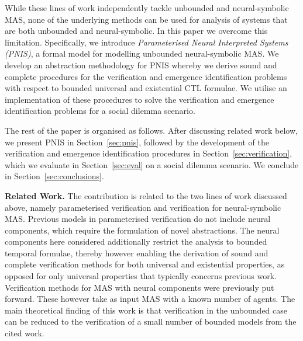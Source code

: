 While these lines of work independently tackle unbounded and neural-symbolic
MAS, none of the underlying methods can be used for analysis of systems that are
both unbounded and neural-symbolic.  In this paper we overcome this limitation.
Specifically, we introduce \emph{Parameterised Neural Interpreted Systems (PNIS)}, a
formal model
for modelling unbounded neural-symbolic MAS.  We develop an abstraction
methodology for PNIS whereby we derive sound and complete procedures for the
verification and emergence identification problems with respect to bounded
universal and existential CTL formulae.  We utilise an implementation of these
procedures to solve the verification and emergence identification problems for a
social dilemma scenario.




The rest of the paper is organised as follows. After discussing related work
below, we present PNIS in Section~\ref{sec:pnis}, followed by the development of
the verification and emergence identification procedures in
Section~\ref{sec:verification}, which we evaluate in Section~\ref{sec:eval}  on
a social dilemma scenario. We conclude in Section~\ref{sec:conclusions}.


{\bf Related Work.}  The contribution is related to the two lines of work
discussed above, namely parameterised verification and verification for
neural-symbolic MAS. Previous models in parameterised verification do not
include neural components, which require the formulation of novel abstractions.
The neural components here considered additionally restrict the analysis to
bounded temporal formulae, thereby however enabling the derivation of sound and
complete verification methods for both universal and existential properties, as
opposed for only universal properties that typically concerns previous work.
Verification methods for MAS with neural components were previously put forward.
These however take as input MAS with a known number of agents. The main
theoretical finding of this work is that verification in the unbounded
case can be reduced to the verification of a small number of bounded models from
the cited work.

